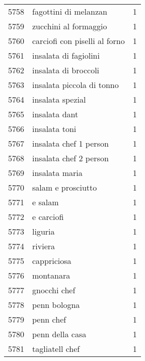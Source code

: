 \begin{tabular}{llr}
5758 &                              fagottini di melanzan &      1 \\
5759 &                              zucchini al formaggio &      1 \\
5760 &                      carciofi con piselli al forno &      1 \\
5761 &                              insalata di fagiolini &      1 \\
5762 &                               insalata di broccoli &      1 \\
5763 &                          insalata piccola di tonno &      1 \\
5764 &                                   insalata spezial &      1 \\
5765 &                                      insalata dant &      1 \\
5766 &                                      insalata toni &      1 \\
5767 &                             insalata chef 1 person &      1 \\
5768 &                             insalata chef 2 person &      1 \\
5769 &                                     insalata maria &      1 \\
5770 &                                 salam e prosciutto &      1 \\
5771 &                                            e salam &      1 \\
5772 &                                         e carciofi &      1 \\
5773 &                                            liguria &      1 \\
5774 &                                            riviera &      1 \\
5775 &                                        cappriciosa &      1 \\
5776 &                                          montanara &      1 \\
5777 &                                       gnocchi chef &      1 \\
5778 &                                       penn bologna &      1 \\
5779 &                                          penn chef &      1 \\
5780 &                                    penn della casa &      1 \\
5781 &                                    tagliatell chef &      1 \\

\end{tabular}
